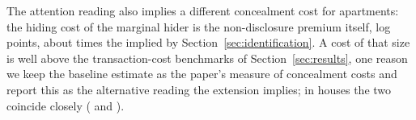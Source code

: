 The attention reading also implies a different concealment cost for apartments: the hiding cost of the marginal hider is the non-disclosure premium itself, \attDthreeApt{} log points, about \attCzeroRatio{} times the \attCzeroBaseApt{} implied by Section~\ref{sec:identification}. A cost of that size is well above the transaction-cost benchmarks of Section~\ref{sec:results}, one reason we keep the baseline estimate as the paper's measure of concealment costs and report this as the alternative reading the extension implies; in houses the two coincide closely (\attCzeroBaseHouse{} and \attDthreeHouse{}).
